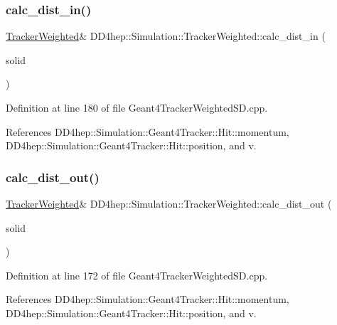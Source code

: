 \subsubsection{\texorpdfstring{calc\+\_\+dist\+\_\+in()}{calc\_dist\_in()}}
{\footnotesize\ttfamily \hyperlink{struct_d_d4hep_1_1_simulation_1_1_tracker_weighted}{Tracker\+Weighted}\& D\+D4hep\+::\+Simulation\+::\+Tracker\+Weighted\+::calc\+\_\+dist\+\_\+in (\begin{DoxyParamCaption}\item[{const G4\+V\+Solid $\ast$}]{solid }\end{DoxyParamCaption})\hspace{0.3cm}{\ttfamily [inline]}}



Definition at line 180 of file Geant4\+Tracker\+Weighted\+S\+D.\+cpp.



References D\+D4hep\+::\+Simulation\+::\+Geant4\+Tracker\+::\+Hit\+::momentum, D\+D4hep\+::\+Simulation\+::\+Geant4\+Tracker\+::\+Hit\+::position, and v.

\hypertarget{struct_d_d4hep_1_1_simulation_1_1_tracker_weighted_ac7628c08fbf29a1dc2133ac7b30e1499}{}\label{struct_d_d4hep_1_1_simulation_1_1_tracker_weighted_ac7628c08fbf29a1dc2133ac7b30e1499} 
\subsubsection{\texorpdfstring{calc\+\_\+dist\+\_\+out()}{calc\_dist\_out()}}
{\footnotesize\ttfamily \hyperlink{struct_d_d4hep_1_1_simulation_1_1_tracker_weighted}{Tracker\+Weighted}\& D\+D4hep\+::\+Simulation\+::\+Tracker\+Weighted\+::calc\+\_\+dist\+\_\+out (\begin{DoxyParamCaption}\item[{const G4\+V\+Solid $\ast$}]{solid }\end{DoxyParamCaption})\hspace{0.3cm}{\ttfamily [inline]}}



Definition at line 172 of file Geant4\+Tracker\+Weighted\+S\+D.\+cpp.



References D\+D4hep\+::\+Simulation\+::\+Geant4\+Tracker\+::\+Hit\+::momentum, D\+D4hep\+::\+Simulation\+::\+Geant4\+Tracker\+::\+Hit\+::position, and v.

